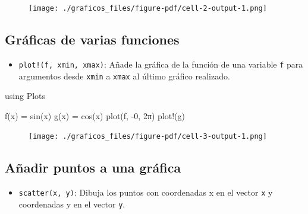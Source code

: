 \documentclass[
  letterpaper,
  DIV=11,
  numbers=noendperiod]{scrreprt}
\newenvironment{Shaded}{\begin{snugshade}}{\end{snugshade}}
\newcommand{\BuiltInTok}[1]{\textcolor[rgb]{0.00,0.23,0.31}{#1}}
\newcommand{\FloatTok}[1]{\textcolor[rgb]{0.68,0.00,0.00}{#1}}
\newcommand{\FunctionTok}[1]{\textcolor[rgb]{0.28,0.35,0.67}{#1}}
\newcommand{\ImportTok}[1]{\textcolor[rgb]{0.00,0.46,0.62}{#1}}
\newcommand{\NormalTok}[1]{\textcolor[rgb]{0.00,0.23,0.31}{#1}}
\newcommand{\OperatorTok}[1]{\textcolor[rgb]{0.37,0.37,0.37}{#1}}
\providecommand{\tightlist}{%
  \setlength{\itemsep}{0pt}\setlength{\parskip}{0pt}}\usepackage{longtable,booktabs,array}
\begin{document}
\begin{figure}[H]

{\centering \texttt{[image: ./graficos\_files/figure-pdf/cell-2-output-1.png]}

}

\end{figure}

\hypertarget{gruxe1ficas-de-varias-funciones}{%
\subsection{Gráficas de varias
funciones}\label{gruxe1ficas-de-varias-funciones}}

\begin{itemize}
\tightlist
\item
  \texttt{plot!(f,\ xmin,\ xmax)}: Añade la gráfica de la función de una
  variable \texttt{f} para argumentos desde \texttt{xmin} a
  \texttt{xmax} al último gráfico realizado.
\end{itemize}

\begin{Shaded}
\begin{Highlighting}[]
\ImportTok{using} \BuiltInTok{Plots}

\FunctionTok{f}\NormalTok{(x) }\OperatorTok{=} \FunctionTok{sin}\NormalTok{(x)}
\FunctionTok{g}\NormalTok{(x) }\OperatorTok{=} \FunctionTok{cos}\NormalTok{(x)}
\FunctionTok{plot}\NormalTok{(f, }\OperatorTok{{-}}\FloatTok{0}\NormalTok{, }\FloatTok{2}\NormalTok{π)}
\FunctionTok{plot!}\NormalTok{(g)}
\end{Highlighting}
\end{Shaded}

\begin{figure}[H]

{\centering \texttt{[image: ./graficos\_files/figure-pdf/cell-3-output-1.png]}

}

\end{figure}

\hypertarget{auxf1adir-puntos-a-una-gruxe1fica}{%
\subsection{Añadir puntos a una
gráfica}\label{auxf1adir-puntos-a-una-gruxe1fica}}

\begin{itemize}
\tightlist
\item
  \texttt{scatter(x,\ y)}: Dibuja los puntos con coordenadas x en el
  vector \texttt{x} y coordenadas y en el vector \texttt{y}.
\end{itemize}
\end{document}
